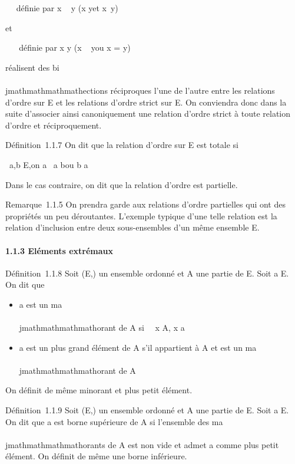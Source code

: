 \leqslant \mapsto~ \prec~\text définie par x \prec~
y \Leftrightarrow (x \leqslant y\text et
x\neq~y)

et

\prec~ \mapsto~ \leqslant\text définie par x \leqslant
y \Leftrightarrow (x \prec~ y\text ou x = y)

réalisent des bi\\\\jmathmathmathmathections réciproques l'une de l'autre entre les
relations d'ordre sur E et les relations d'ordre strict sur E. On
conviendra donc dans la suite d'associer ainsi canoniquement une
relation d'ordre strict à toute relation d'ordre et réciproquement.

Définition~1.1.7 On dit que la relation d'ordre \leqslant sur E est totale si

\forall~a,b \in E,\text on a ~a \leqslant
b\text ou b \leqslant a

Dans le cas contraire, on dit que la relation d'ordre est partielle.

Remarque~1.1.5 On prendra garde aux relations d'ordre partielles qui ont
des propriétés un peu déroutantes. L'exemple typique d'une telle
relation est la relation d'inclusion entre deux sous-ensembles d'un même
ensemble E.

\paragraph{1.1.3 Eléments extrémaux}

Définition~1.1.8 Soit (E,\leqslant) un ensemble ordonné et A une partie de E.
Soit a \in E. On dit que

\begin{itemize}
\itemsep1pt\parskip0pt
\item
  a est un ma\\\\jmathmathmathmathorant de A si \forall~~x \in A, x \leqslant a
\item
  a est un plus grand élément de A s'il appartient à A et est un
  ma\\\\jmathmathmathmathorant de A
\end{itemize}

On définit de même minorant et plus petit élément.

Définition~1.1.9 Soit (E,\leqslant) un ensemble ordonné et A une partie de E.
Soit a \in E. On dit que a est borne supérieure de A si l'ensemble des
ma\\\\jmathmathmathmathorants de A est non vide et admet a comme plus petit élément. On
définit de même une borne inférieure.

